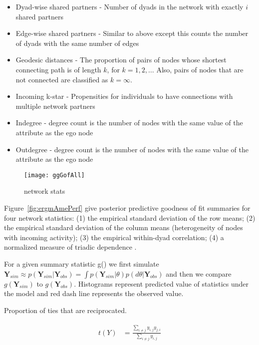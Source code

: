 \begin{itemize}
\item Dyad-wise shared partners - Number of dyads in the network with exactly $i$ shared partners
\item Edge-wise shared partners - Similar to above except this counts the number of dyads with the same number of edges
\item Geodesic distances - The proportion of pairs of nodes whose shortest connecting path is of length $k$, for $k=1,2,\ldots$ Also, pairs of nodes that are not connected are classified as $k=\infty$.
\item Incoming k-star - Propensities for individuals to have connections with multiple network partners
\item Indegree - degree count is the number of nodes with the same value of the attribute as the ego node
\item Outdegree - degree count is the number of nodes with the same value of the attribute as the ego node
\end{itemize}

\begin{figure}[ht]
	\centering
	\texttt{[image: ggGofAll]}
	\caption{network stats }
	\label{fig:gofAll}
\end{figure}

Figure~\ref{fig:ergmAmePerf} give posterior predictive goodness of fit summaries for four network statistics: (1) the empirical standard deviation of the row means; (2) the empirical standard deviation of the column means (heterogeneity of nodes with incoming activity); (3) the empirical within-dyad correlation; (4) a normalized measure of triadic dependence \citep{hoff:etal:2015}. 

For a given summary statistic g() we first simulate $\mathbf{Y}_{sim} \approx p(\mathbf{Y}_{sim} | \mathbf{Y}_{obs}) = \int p(\mathbf{Y}_{sim} | \theta) p(d \theta | \mathbf{Y}_{obs})$ and then we compare $g(\mathbf{Y}_{sim})$ to $g(\mathbf{Y}_{obs})$. Histograms represent predicted value of statistics under the model and red dash line represents the observed value. 

Proportion of ties that are reciprocated. 

\begin{align}
\begin{aligned}
t(Y) &= \frac{ \sum_{i \neq j}y_{i,j} y_{j,i} }{ \sum_{i \neq j} y_{i,j} } \\
\end{aligned}
\end{align}

